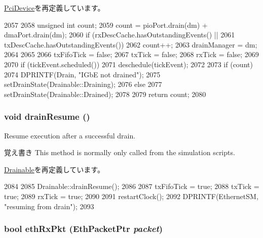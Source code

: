\hyperlink{classPciDevice_aa8a18d230dba7a674ac8a0b4f35bc36a}{PciDevice}を再定義しています。


\begin{DoxyCode}
2057 {
2058     unsigned int count;
2059     count = pioPort.drain(dm) + dmaPort.drain(dm);
2060     if (rxDescCache.hasOutstandingEvents() ||
2061         txDescCache.hasOutstandingEvents()) {
2062         count++;
2063         drainManager = dm;
2064     }
2065 
2066     txFifoTick = false;
2067     txTick = false;
2068     rxTick = false;
2069 
2070     if (tickEvent.scheduled())
2071         deschedule(tickEvent);
2072 
2073     if (count) {
2074         DPRINTF(Drain, "IGbE not drained\n");
2075         setDrainState(Drainable::Draining);
2076     } else
2077         setDrainState(Drainable::Drained);
2078 
2079     return count;
2080 }
\end{DoxyCode}
\hypertarget{classIGbE_a8f020d3237536fe007fc488c4125c5d8}{
\subsubsection[{drainResume}]{\setlength{\rightskip}{0pt plus 5cm}void drainResume ()}}
\label{classIGbE_a8f020d3237536fe007fc488c4125c5d8}
Resume execution after a successful drain.

\begin{DoxyNote}{覚え書き}
This method is normally only called from the simulation scripts. 
\end{DoxyNote}


\hyperlink{classDrainable_a8f020d3237536fe007fc488c4125c5d8}{Drainable}を再定義しています。


\begin{DoxyCode}
2084 {
2085     Drainable::drainResume();
2086 
2087     txFifoTick = true;
2088     txTick = true;
2089     rxTick = true;
2090 
2091     restartClock();
2092     DPRINTF(EthernetSM, "resuming from drain");
2093 }
\end{DoxyCode}
\hypertarget{classIGbE_aaae8ccdf0f0b15e4d1b93e71a0c8b303}{
\subsubsection[{ethRxPkt}]{\setlength{\rightskip}{0pt plus 5cm}bool ethRxPkt ({\bf EthPacketPtr} {\em packet})}}
\label{classIGbE_aaae8ccdf0f0b15e4d1b93e71a0c8b303}



